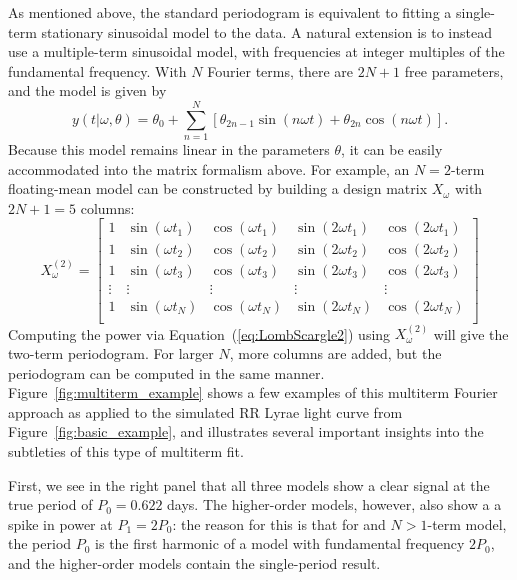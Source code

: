 \documentclass{emulateapj}
\newcommand{\Fig}[1]{Figure~\ref{fig:#1}}
\newcommand{\fig}[1]{\Fig{#1}}
\newcommand{\Eq}[1]{Equation~(\ref{eq:#1})}
\newcommand{\eq}[1]{\Eq{#1}}
\begin{document}
As mentioned above, the standard periodogram is equivalent to fitting a single-term stationary sinusoidal model to the data. A natural extension is to instead use a multiple-term sinusoidal model, with frequencies at integer multiples of the fundamental frequency. With $N$ Fourier terms, there are $2N + 1$ free parameters, and the model is given by
\begin{equation}
  y(t|\omega,\theta) = \theta_0 + \sum_{n=1}^N \left[\theta_{2n - 1}\sin(n\omega t) + \theta_{2n}\cos(n\omega t)\right].
\end{equation}
Because this model remains linear in the parameters $\theta$, it can be easily accommodated into the matrix formalism above. For example, an $N = 2$-term floating-mean model can be constructed by building a design matrix $X_\omega$ with $2N + 1 = 5$ columns:
\begin{equation}
X_\omega^{(2)} = \left[
\begin{array}{ccccc}
1 & \sin(\omega t_1) & \cos(\omega t_1) & \sin(2\omega t_1) & \cos(2\omega t_1)\\
1 & \sin(\omega t_2) & \cos(\omega t_2) & \sin(2\omega t_2) & \cos(2\omega t_2)\\
1 & \sin(\omega t_3) & \cos(\omega t_3) & \sin(2\omega t_3) & \cos(2\omega t_3)\\
\vdots & \vdots & \vdots & \vdots & \vdots \\
1 & \sin(\omega t_N) & \cos(\omega t_N) & \sin(2\omega t_N) & \cos(2\omega t_N)\\
\end{array}
\right]
\end{equation}
Computing the power via \eq{LombScargle2} using $X_\omega^{(2)}$ will give the two-term periodogram. For larger $N$, more columns are added, but the periodogram can be computed in the same manner. \fig{multiterm_example} shows a few examples of this multiterm Fourier approach as applied to the simulated RR Lyrae light curve from \fig{basic_example}, and illustrates several important insights into the subtleties of this type of multiterm fit.

First, we see in the right panel that all three models show a clear signal at the true period of $P_0 = 0.622$ days. The higher-order models, however, also show a a spike in power at $P_1 = 2 P_0$: the reason for this is that for and $N>1$-term model, the period $P_0$ is the first harmonic of a model with fundamental frequency $2P_0$, and the higher-order models contain the single-period result.
\end{document}
